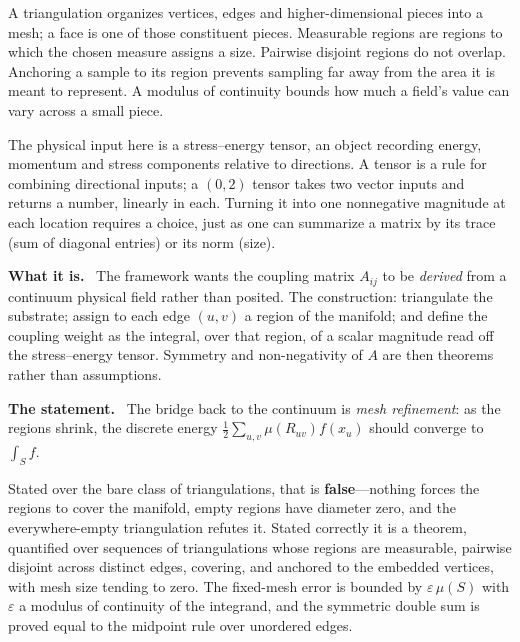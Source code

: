 \documentclass[11pt]{article}
\newcommand{\what}{\par\smallskip\noindent\textbf{What it is.}\ }
\newcommand{\statement}{\par\smallskip\noindent\textbf{The statement.}\ }
\begin{document}
A triangulation organizes vertices, edges and higher-dimensional pieces into
a mesh; a face is one of those constituent pieces. Measurable regions are
regions to which the chosen measure assigns a size. Pairwise disjoint regions
do not overlap. Anchoring a sample to its region prevents sampling far away
from the area it is meant to represent. A modulus of continuity bounds how
much a field's value can vary across a small piece.

The physical input here is a stress--energy tensor, an object recording energy,
momentum and stress components relative to directions. A tensor is a rule for
combining directional inputs; a $(0,2)$ tensor takes two vector inputs and
returns a number, linearly in each. Turning it into one nonnegative magnitude
at each location requires a choice, just as one can summarize a matrix by its
trace (sum of diagonal entries) or its norm (size).

\what
The framework wants the coupling matrix $A_{ij}$ to be \emph{derived} from a
continuum physical field rather than posited. The construction: triangulate the
substrate; assign to each edge $(u,v)$ a region of the manifold; and define the
coupling weight as the integral, over that region, of a scalar magnitude read
off the stress--energy tensor. Symmetry and non-negativity of $A$ are then
theorems rather than assumptions.

\statement
The bridge back to the continuum is \emph{mesh refinement}: as the regions
shrink, the discrete energy $\tfrac12\sum_{u,v}\mu(R_{uv})f(x_u)$ should
converge to $\int_S f$.

Stated over the bare class of triangulations, that is \textbf{false}---nothing
forces the regions to cover the manifold, empty regions have diameter zero, and
the everywhere-empty triangulation refutes it. Stated correctly it is a
theorem, quantified over sequences of triangulations whose regions are
measurable, pairwise disjoint across distinct edges, covering, and anchored to
the embedded vertices, with mesh size tending to zero. The fixed-mesh error is
bounded by $\varepsilon\,\mu(S)$ with $\varepsilon$ a modulus of continuity of
the integrand, and the symmetric double sum is proved equal to the midpoint
rule over unordered edges.
\end{document}
